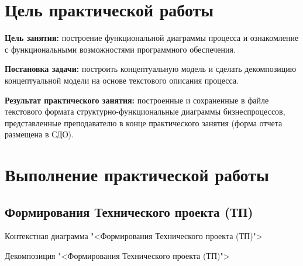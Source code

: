 \graphicspath{{./first/img/}}

\section{Цель практической работы}
\textbf{Цель занятия:} построение функциональной диаграммы процесса и
ознакомление с функциональными возможностями программного
обеспечения.\par
\textbf{Постановка задачи:} построить концептуальную модель и сделать
декомпозицию концептуальной модели на основе текстового описания
процесса.\par
\textbf{Результат практического занятия:} построенные и сохраненные в
файле текстового формата структурно-функциональные диаграммы бизнеспроцессов, представленные преподавателю в конце практического занятия
(форма отчета размещена в СДО).

\section{Выполнение практической работы}
\subsection{Формирования Технического проекта (ТП)}

\begin{image}
	\caption{Контекстная диаграмма "<Формирования Технического проекта (ТП)">}
	\label{fig:IDEF0:a0}
\end{image}

\begin{image}
	\caption{Декомпозиция "<Формирования Технического проекта (ТП)">}
	\label{fig:IDEF0:a1}
\end{image}

